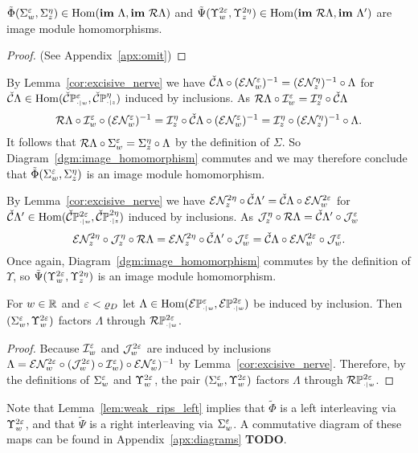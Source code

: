 \begin{lemma}\label{lem:rips_homomorphism_left}
  $\tilde{\Phi}(\Sigma_w^\e,\Sigma_z^\eta)\in\Hom(\im~\Lambda,\im~\rips\Lambda)$ and $\tilde{\Psi}(\Upsilon_w^{2\e},\Upsilon_z^{2\eta})\in\Hom(\im~\rips\Lambda,\im~\Lambda')$ are image module homomorphisms.
\end{lemma}
\begin{proof}
  (See Appendix~\ref{apx:omit})
\end{proof}
\proofatend
  By Lemma~\ref{cor:excisive_nerve} we have $\cech\Lambda\circ (\E\N_w^\e)^{-1} = (\E\N_z^\eta)^{-1}\circ \Lambda$ for $\cech\Lambda\in\Hom(\CPP{w}{\e},\CPP{z}{\eta})$ induced by inclusions.
  As $\rips\Lambda\circ\I_w^\e = \I_z^\eta\circ\cech\Lambda$
  \[ \rips\Lambda\circ \I_w^\e\circ(\E\N_w^\e)^{-1} = \I_z^\eta\circ\cech\Lambda\circ (\E\N_w^\e)^{-1} = \I_z^\eta\circ (\E\N_z^\eta)^{-1}\circ\Lambda.\]
  It follows that $\rips\Lambda\circ\Sigma_w^\e = \Sigma_z^\eta\circ\Lambda$ by the definition of $\Sigma$.
  So Diagram~\ref{dgm:image_homomorphism} commutes and we may therefore conclude that $\tilde{\Phi}(\Sigma_w^\e,\Sigma_z^\eta)$ is an image module homomorphism.

  By Lemma~\ref{cor:excisive_nerve} we have $\E\N_z^{2\eta} \circ\cech\Lambda'  = \cech \Lambda\circ \E\N_w^{2\e}$ for $\cech\Lambda'\in\Hom(\CPP{w}{2\e},\CPP{z}{2\eta})$ induced by inclusions.
  As $\J_z^\eta\circ \rips\Lambda = \cech\Lambda'\circ\J_w^\e$
  \[ \E\N_z^{2\eta}\circ \J_z^\eta\circ \rips\Lambda = \E\N_z^{2\eta}\circ\cech\Lambda'\circ\J_w^\e = \cech \Lambda\circ \E\N_w^{2\e}\circ\J_w^\e.\]
  Once again, Diagram~\ref{dgm:image_homomorphism} commutes by the definition of $\Upsilon$, so $\tilde{\Psi}(\Upsilon_w^{2\e},\Upsilon_z^{2\eta})$ is an image module homomorphism.
\endproofatend

\begin{lemma}\label{lem:weak_rips_left}
  For $w\in\R$ and $\e < \varrho_D$ let $\Lambda\in\Hom(\ext{\PP{w}{\e}}, \ext{\PP{w}{2\e}})$ be induced by inclusion.
  Then $(\Sigma_w^\e, \Upsilon_w^{2\e})$ factors $\Lambda$ through $\RPP{w}{2\e}$.
\end{lemma}
\begin{proof}
  Because $\I_w^\e$ and $\J_w^{2\e}$ are induced by inclusions $\Lambda = \E\N_w^{2\e}\circ (\J_w^{2\e})\circ \I_w^\e)\circ \E\N_w^\e)^{-1}$ by Lemma~\ref{cor:excisive_nerve}.
  Therefore, by the definitions of $\Sigma_w^\e$ and $\Upsilon_w^{2\e}$, the pair $(\Sigma_w^\e, \Upsilon_w^{2\e})$ factors $\Lambda$ through $\RPP{w}{2\e}$.
\end{proof}

Note that Lemma~\ref{lem:weak_rips_left} implies that $\tilde{\Phi}$ is a left interleaving via $\Upsilon_w^{2\e}$, and that $\tilde{\Psi}$ is a right interleaving via $\Sigma_w^\e$.
A commutative diagram of these maps can be found in Appendix~\ref{apx:diagrams} \textbf{TODO}.

